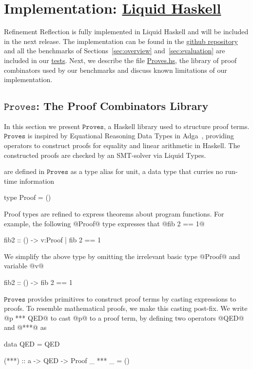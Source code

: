 \section{Implementation: \href{https://github.com/ucsd-progsys/liquidhaskell/tree/popl17}{Liquid Haskell}}

Refinement Reflection is fully implemented in 
Liquid Haskell and will be included in the next release. 
%
The implementation can be found in the
% 
\href{https://github.com/ucsd-progsys/liquidhaskell/tree/popl17}{github repository}
%
and all the benchmarks of Sections~\ref{sec:overview} and~\ref{sec:evaluation}
are included in our 
%
\href{https://github.com/ucsd-progsys/liquidhaskell/tree/popl17/benchmarks/popl17/pos}{tests}. 
%
Next, we describe the file 
%
\href{https://github.com/ucsd-progsys/liquidhaskell/blob/popl17/benchmarks/popl17/pos/Proves.hs}{Proves.hs}, 
%
the library of proof combinators used by our benchmarks
and discuss known limitations of our implementation. 


\renewcommand\libname{\ensuremath{\texttt{Proves}}\xspace}

\subsection{\libname: The Proof Combinators Library}
\label{subsec:library}

In this section we present \libname,
a Haskell library used to structure proof terms.
%
\libname is inspired by Equational Reasoning Data Types
in Adga~\citep{agdaequational}, providing operators to
construct proofs for equality and linear arithmetic in Haskell.
%
The constructed proofs are checked by an SMT-solver via Liquid Types.

 are defined in \libname as a type alias for unit,
a data type that curries no run-time information
%
\begin{code}
  type Proof = ()
\end{code}
%
Proof types are refined to express theorems about program functions.
%
For example, the following @Proof@ type expresses that
@fib 2 == 1@
%
\begin{code}
  fib2 :: () -> {v:Proof | fib 2 == 1}
\end{code}
%
We simplify the above type by omitting the irrelevant
basic type @Proof@ and variable @v@
%
\begin{code}
  fib2 :: () -> { fib 2 == 1 }
\end{code}
%

\libname provides primitives to construct proof terms
by casting expressions to proofs.
%
To resemble mathematical proofs,
we make this casting post-fix.
%
We write @p *** QED@ to cast @p@ to a proof term,
by defining two operators @QED@ and @***@ as
%
\begin{code}
  data QED = QED

  (***) :: a -> QED -> Proof
  _ *** _  = ()
\end{code}


